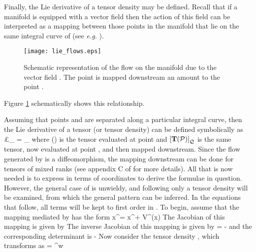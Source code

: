 \documentclass[12pt]{article}
\begin{document}
Finally, the Lie derivative of a tensor density may be defined.
Recall that if a manifold is equipped with a vector field then the action of this
field can be interpreted as a mapping between those points in the manifold that
lie on the same integral curve of  (see \textit{e.g.} ).
\begin{figure}
\centerline{
   \texttt{[image: lie\_flows.eps]}}
   \caption{Schematic representation of the flow on the manifold \mM \nudge due to
   the vector field .  The point \mP \nudge is mapped downstream an amount
   \gl to the point \mQ.}\label{fig:D1}
\end{figure}
Figure \ref{fig:D1} schematically shows this relationship.

Assuming that points \mP and \mQ \push are separated along a particular integral curve,
then the Lie derivative of a tensor (or tensor density) can be defined symbolically
as
\be\label{eq:D12}
  \pounds_{}  = \lim_{\gl {}}
                            \frac
                              {}
                              {\gl} \eqc
\ee
where (\mQ \back) is the tensor evaluated at point \mQ \push and $\left[ {\mathbf{{T}}(\mathcal P)} \right]_{\mathcal Q}$
is the same tensor, now evaluated at point \mP, and then mapped downstream.
Since the flow generated by  is a diffeomorphism, the mapping downstream can be done
for tensors of mixed ranks (see appendix C of  for more details).
All that is now needed is to express  in terms of coordinates to derive
the formulae in question.
However, the general case of  is unwieldy, and following 
only a  tensor density will be examined, from which the general pattern
can be inferred.
In the equations that follow, all terms will be kept to first order in \gl.
To begin, assume that the mapping mediated by  has the form
\be
  {\tilde x}^\gm = x^\gm + \gl V^{\gm}(x) \eqp
\ee
The Jacobian of this mapping is given by
\be
  \Jac{\gtm}{\gn} \equiv {}
\ee
The inverse Jacobian of this mapping is given by
\be
  \jac{\gtn}{\gb} = \kd{\gn}{\gb} - \gl {} \eqc
\ee
and the corresponding determinant is
\be
  \mJ {} - \gl {} \eqp
\ee
Now consider the  tensor density \idx{\mT}{\up{\gm}\dn{\gn}},
which transforms as
\be
  \idx{\mT}{\up{\gtm}\dn{\gtn}} = \mJ^w \Jac{\gtm}{\ga} \jac{\gtn}{\gb}
                                  \idx{\mT}{\up{\ga}\dn{\gb}} \eqp
\end{document}

